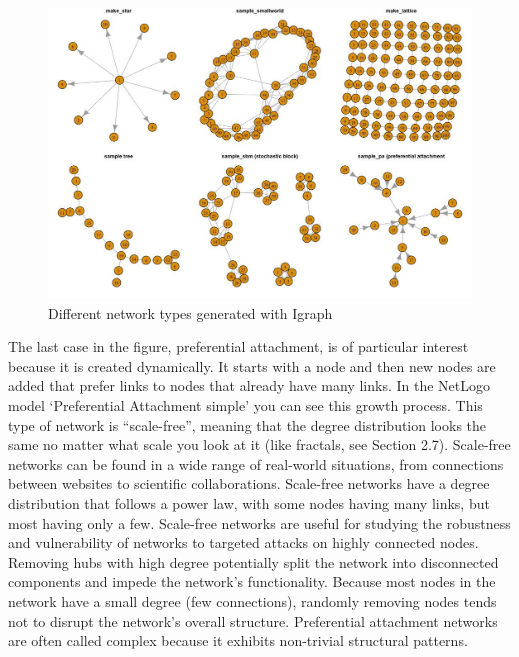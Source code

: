 \documentclass[
  letterpaper,
]{scrbook}
\begin{document}
\begin{figure}

{\centering \includegraphics[width=5.37769in,height=\textheight]{media/ch6/image3.jpg}

}

\caption{\label{fig-ch6-img3-old-72}Different network types generated
with Igraph}

\end{figure}

The last case in the figure, preferential attachment, is of particular
interest because it is created dynamically. It starts with a node and
then new nodes are added that prefer links to nodes that already have
many links. In the NetLogo model `Preferential Attachment simple' you
can see this growth process. This type of network is ``scale-free'',
meaning that the degree distribution looks the same no matter what scale
you look at it (like fractals, see Section 2.7). Scale-free networks can
be found in a wide range of real-world situations, from connections
between websites to scientific collaborations. Scale-free networks have
a degree distribution that follows a power law, with some nodes having
many links, but most having only a few. Scale-free networks are useful
for studying the robustness and vulnerability of networks to targeted
attacks on highly connected nodes. Removing hubs with high degree
potentially split the network into disconnected components and impede
the network's functionality. Because most nodes in the network have a
small degree (few connections), randomly removing nodes tends not to
disrupt the network's overall structure. Preferential attachment
networks are often called complex because it exhibits non-trivial
structural patterns.
\end{document}
